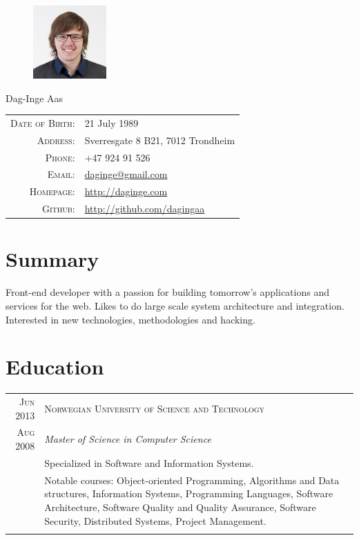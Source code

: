 \documentclass[a4paper,10pt]{article}
\begin{document}
\pagestyle{empty}
  \begin{figure}
  \includegraphics[width=0.25\textwidth]{fotogjengen_cropped.jpg}
  \end{figure}
\par{
  {\Huge Dag-Inge Aas }
  \bigskip\par}

  \begin{tabular}{rl}
  \textsc{Date of Birth:} & 21 July 1989\\
    \textsc{Address:}& Sverresgate 8 B21, 7012 Trondheim\\
    \textsc{Phone:}& +47 924 91 526\\
    \textsc{Email:}& \href{mailto:daginge@gmail.com}{daginge@gmail.com}\\
    \textsc{Homepage:}& \href{http://daginge.com}{http://daginge.com}\\
    \textsc{Github:}& \href{http://github.com/dagingaa}{http://github.com/dagingaa}\\
\end{tabular}

\section{Summary}
\par{
Front-end developer with a passion for building tomorrow's applications and services for the web. Likes to do large scale system architecture and integration. Interested in new technologies, methodologies and hacking. }

\section{Education}
\begin{tabular}{r|p{12cm}}
  \textsc{Jun 2013} & \textsc{Norwegian University of Science and Technology} \\\textsc{Aug 2008}&\emph{Master of Science in Computer Science}\\&\footnotesize{Specialized in Software and Information Systems.} \\& \footnotesize{Notable courses: Object-oriented Programming, Algorithms and Data structures, Information Systems, Programming Languages, Software Architecture, Software Quality and Quality Assurance, Software Security, Distributed Systems, Project Management.}\\\multicolumn{2}{c}{} \\
\end{tabular}
\end{document}
